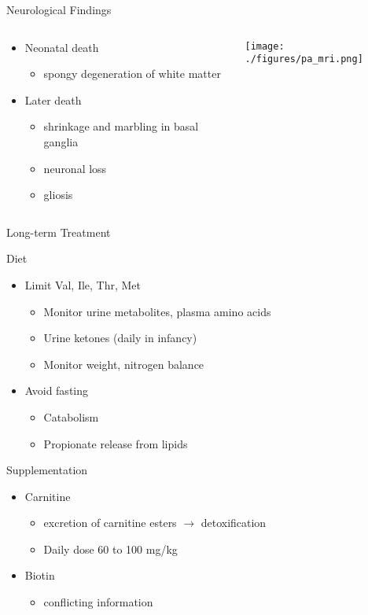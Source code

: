 \documentclass[presentation, smaller]{beamer}
\begin{document}
\begin{frame}[label={sec:orgheadline21}]{Neurological Findings}
\begin{columns}
\begin{column}{.5\columnwidth}
\begin{itemize}
\item Neonatal death
\begin{itemize}
\item spongy degeneration of white matter
\end{itemize}
\item Later death
\begin{itemize}
\item shrinkage and marbling in basal ganglia
\item neuronal loss
\item gliosis
\end{itemize}
\end{itemize}
\end{column}
\begin{column}{.5\columnwidth}
\texttt{[image: ./figures/pa\_mri.png]}
\end{column}
\end{columns}
\end{frame}

\begin{frame}[label={sec:orgheadline22}]{Long-term Treatment}
\begin{block}{Diet}
\begin{itemize}
\item Limit Val, Ile, Thr, Met
\begin{itemize}
\item Monitor urine metabolites, plasma amino acids
\item Urine ketones (daily in infancy)
\item Monitor weight, nitrogen balance
\end{itemize}
\item Avoid fasting
\begin{itemize}
\item Catabolism
\item Propionate release from lipids
\end{itemize}
\end{itemize}
\end{block}

\begin{block}{Supplementation}
\begin{itemize}
\item Carnitine
\begin{itemize}
\item excretion of carnitine esters \(\to\) detoxification
\item Daily dose 60 to 100 mg/kg
\end{itemize}
\item Biotin
\begin{itemize}
\item conflicting information
\end{itemize}
\end{itemize}
\end{block}
\end{frame}
\end{document}
